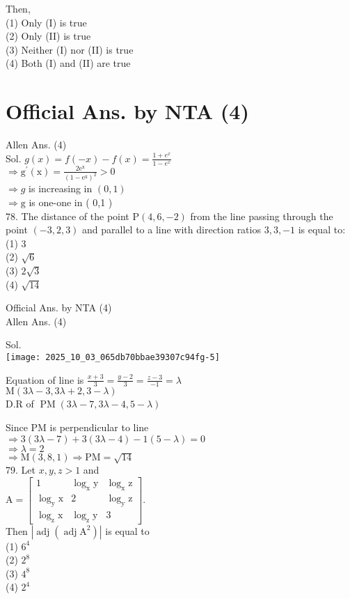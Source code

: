\documentclass[10pt]{article}
\begin{document}
Then,\\
(1) Only (I) is true\\
(2) Only (II) is true\\
(3) Neither (I) nor (II) is true\\
(4) Both (I) and (II) are true

\section*{Official Ans. by NTA (4)}
Allen Ans. (4)\\
Sol. \(g(x)=f(-x)-f(x)=\frac{1+e^{x}}{1-e^{x}}\)\\
\(\Rightarrow \mathrm{g}^{\prime}(\mathrm{x})=\frac{2 \mathrm{e}^{\mathrm{x}}}{\left(1-\mathrm{e}^{\mathrm{x}}\right)^{2}}>0\)\\
\(\Rightarrow g\) is increasing in \((0,1)\)\\
\(\Rightarrow \mathrm{g}\) is one-one in ( 0,1 )\\
78. The distance of the point \(\mathrm{P}(4,6,-2)\) from the line passing through the point \((-3,2,3)\) and parallel to a line with direction ratios \(3,3,-1\) is equal to:\\
(1) 3\\
(2) \(\sqrt{6}\)\\
(3) \(2 \sqrt{3}\)\\
(4) \(\sqrt{14}\)

Official Ans. by NTA (4)\\
Allen Ans. (4)

Sol.\\
\texttt{[image: 2025\_10\_03\_065db70bbae39307c94fg-5]}

Equation of line is \(\frac{x+3}{3}=\frac{y-2}{3}=\frac{z-3}{-1}=\lambda\)\\
\(\mathrm{M}(3 \lambda-3,3 \lambda+2,3-\lambda)\)\\
D.R of \(\operatorname{PM}(3 \lambda-7,3 \lambda-4,5-\lambda)\)

Since PM is perpendicular to line\\
\(\Rightarrow 3(3 \lambda-7)+3(3 \lambda-4)-1(5-\lambda)=0\)\\
\(\Rightarrow \lambda=2\)\\
\(\Rightarrow \mathrm{M}(3,8,1) \Rightarrow \mathrm{PM}=\sqrt{14}\)\\
79. Let \(x, y, z>1\) and\\
\(\mathrm{A}=\left[\begin{array}{lll}1 & \log _{\mathrm{x}} \mathrm{y} & \log _{\mathrm{x}} \mathrm{z} \\ \log _{\mathrm{y}} \mathrm{x} & 2 & \log _{\mathrm{y}} \mathrm{z} \\ \log _{\mathrm{z}} \mathrm{x} & \log _{\mathrm{z}} \mathrm{y} & 3\end{array}\right]\).\\
Then \(\left|\operatorname{adj}\left(\operatorname{adj} \mathrm{A}^{2}\right)\right|\) is equal to\\
(1) \(6^{4}\)\\
(2) \(2^{8}\)\\
(3) \(4^{8}\)\\
(4) \(2^{4}\)
\end{document}
